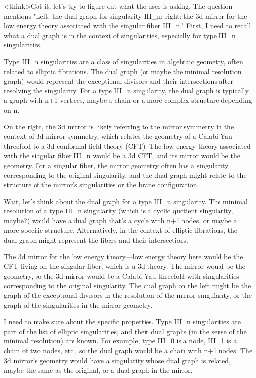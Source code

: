 <think>Got it, let's try to figure out what the user is asking. The question mentions "Left: the dual graph for singularity III_n; right: the 3d mirror for the low energy theory associated with the singular fiber III_n." First, I need to recall what a dual graph is in the context of singularities, especially for type III_n singularities. 

Type III_n singularities are a class of singularities in algebraic geometry, often related to elliptic fibrations. The dual graph (or maybe the minimal resolution graph) would represent the exceptional divisors and their intersections after resolving the singularity. For a type III_n singularity, the dual graph is typically a graph with n+1 vertices, maybe a chain or a more complex structure depending on n. 

On the right, the 3d mirror is likely referring to the mirror symmetry in the context of 3d mirror symmetry, which relates the geometry of a Calabi-Yau threefold to a 3d conformal field theory (CFT). The low energy theory associated with the singular fiber III_n would be a 3d CFT, and its mirror would be the geometry. For a singular fiber, the mirror geometry often has a singularity corresponding to the original singularity, and the dual graph might relate to the structure of the mirror's singularities or the brane configuration.

Wait, let's think about the dual graph for a type III_n singularity. The minimal resolution of a type III_n singularity (which is a cyclic quotient singularity, maybe?) would have a dual graph that's a cycle with n+1 nodes, or maybe a more specific structure. Alternatively, in the context of elliptic fibrations, the dual graph might represent the fibers and their intersections. 

The 3d mirror for the low energy theory—low energy theory here would be the CFT living on the singular fiber, which is a 3d theory. The mirror would be the geometry, so the 3d mirror would be a Calabi-Yau threefold with singularities corresponding to the original singularity. The dual graph on the left might be the graph of the exceptional divisors in the resolution of the mirror singularity, or the graph of the singularities in the mirror geometry.

I need to make sure about the specific properties. Type III_n singularities are part of the list of elliptic singularities, and their dual graphs (in the sense of the minimal resolution) are known. For example, type III_0 is a node, III_1 is a chain of two nodes, etc., so the dual graph would be a chain with n+1 nodes. The 3d mirror's geometry would have a singularity whose dual graph is related, maybe the same as the original, or a dual graph in the mirror.

